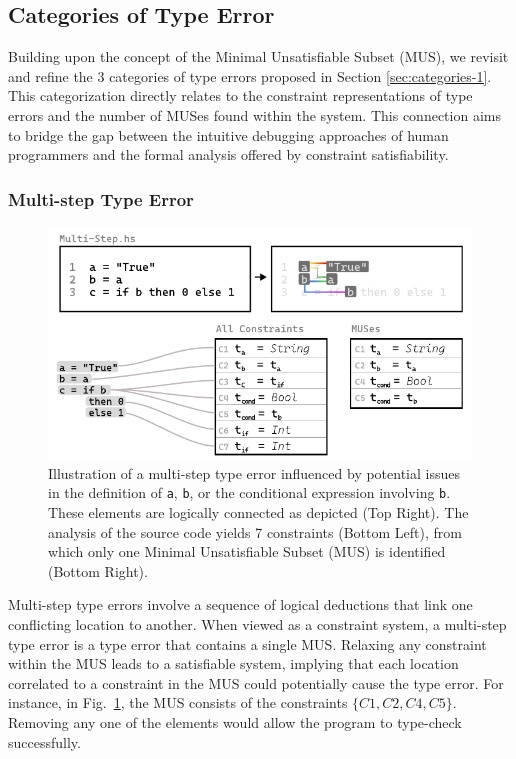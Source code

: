 \documentclass[pdflatex,sn-mathphys-num]{sn-jnl}%
\begin{document}
\subsection{Categories of Type Error} \label{sec:categories-2}

Building upon the concept of the Minimal Unsatisfiable Subset (MUS), we revisit and refine the 3 categories of type errors proposed in Section \ref{sec:categories-1}. This categorization directly relates to the constraint representations of type errors and the number of MUSes found within the system. This connection aims to bridge the gap between the intuitive debugging approaches of human programmers and the formal analysis offered by constraint satisfiability.

\subsubsection*{Multi-step Type Error}

\begin{figure}[hbt]
  \centering \includegraphics[width=\linewidth]{images/Multi-Step-MUS}
  \caption[Illustration of a multi-step type error in the context of MUSes]{Illustration of a multi-step type error influenced by potential issues in the definition of \texttt{a}, \texttt{b}, or the conditional expression involving \texttt{b}. These elements are logically connected as depicted (Top Right). The analysis of the source code yields 7 constraints (Bottom Left), from which only one Minimal Unsatisfiable Subset (MUS) is identified (Bottom Right).}
  \label{fig:multi-step-2}
  \end{figure}


Multi-step type errors involve a sequence of logical deductions that link one conflicting location to another. When viewed as a constraint system, a multi-step type error is a type error that contains a single MUS. Relaxing any constraint within the MUS leads to a satisfiable system, implying that each location correlated to a constraint in the MUS could potentially cause the type error. For instance, in Fig.~\ref{fig:multi-step-2}, the MUS consists of the constraints $\{C1, C2, C4, C5\}$. Removing any one of the elements would allow the program to type-check successfully.
\end{document}
